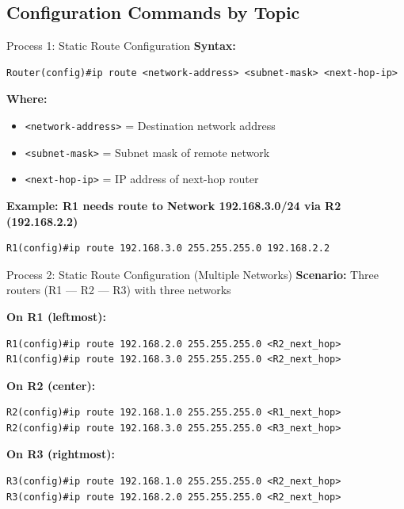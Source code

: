 \documentclass[12pt,a4paper]{article}
\begin{document}
\subsection{Configuration Commands by Topic}

\begin{commandbox}{Process 1: Static Route Configuration}
\textbf{Syntax:}
\begin{lstlisting}
Router(config)#ip route <network-address> <subnet-mask> <next-hop-ip>
\end{lstlisting}

\textbf{Where:}
\begin{itemize}[noitemsep]
    \item \texttt{<network-address>} = Destination network address
    \item \texttt{<subnet-mask>} = Subnet mask of remote network
    \item \texttt{<next-hop-ip>} = IP address of next-hop router
\end{itemize}

\vspace{0.2cm}
\textbf{Example: R1 needs route to Network 192.168.3.0/24 via R2 (192.168.2.2)}
\begin{lstlisting}
R1(config)#ip route 192.168.3.0 255.255.255.0 192.168.2.2
\end{lstlisting}
\end{commandbox}

\begin{commandbox}{Process 2: Static Route Configuration (Multiple Networks)}
\textbf{Scenario:} Three routers (R1 --- R2 --- R3) with three networks

\vspace{0.2cm}
\textbf{On R1 (leftmost):}
\begin{lstlisting}
R1(config)#ip route 192.168.2.0 255.255.255.0 <R2_next_hop>
R1(config)#ip route 192.168.3.0 255.255.255.0 <R2_next_hop>
\end{lstlisting}

\textbf{On R2 (center):}
\begin{lstlisting}
R2(config)#ip route 192.168.1.0 255.255.255.0 <R1_next_hop>
R2(config)#ip route 192.168.3.0 255.255.255.0 <R3_next_hop>
\end{lstlisting}

\textbf{On R3 (rightmost):}
\begin{lstlisting}
R3(config)#ip route 192.168.1.0 255.255.255.0 <R2_next_hop>
R3(config)#ip route 192.168.2.0 255.255.255.0 <R2_next_hop>
\end{lstlisting}
\end{commandbox}
\end{document}
